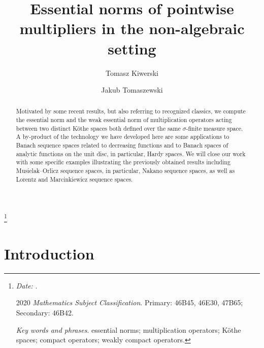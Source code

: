 \documentclass[11pt]{amsart}
\theoremstyle{definition}
\theoremstyle{definition}
\theoremstyle{definition}
\theoremstyle{definition}
\theoremstyle{definition}
\theoremstyle{definition}
\theoremstyle{definition}
\theoremstyle{definition}
\numberwithin{equation}{section}
\numberwithin{equation}{section}
\numberwithin{equation}{section}
\theoremstyle{definition}
\theoremstyle{definition}
\theoremstyle{definition}
\theoremstyle{definition}
\theoremstyle{definition}
\theoremstyle{definition}
\begin{document}
\title{Essential norms of pointwise multipliers in the non-algebraic setting}

\author{Tomasz Kiwerski}
\address[Tomasz Kiwerski]{Pozna\'{n} University of Technology, Institute of Mathematics, Piotrowo 3A, 60-965 Pozna\'{n}, Poland}

\author{Jakub Tomaszewski}
\address[Jakub Tomaszewski]{Pozna\'{n} University of Technology, Institute of Mathematics, Piotrowo 3A, 60-965 Pozna\'{n}, Poland}

\maketitle

\begin{abstract}
	Motivated by some recent results, but also referring to recognized classics, we compute the essential norm and the weak essential norm of
	multiplication operators acting between two distinct K{\" o}the spaces both defined over the same $\sigma$-finite measure space.
	A by-product of the technology we have developed here are some applications to Banach sequence spaces related to decreasing functions
	and to Banach spaces of analytic functions on the unit disc, in particular, Hardy spaces.
	We will close our work with some specific examples illustrating the previously obtained results including Musielak--Orlicz sequence spaces,
	in particular, Nakano sequence spaces, as well as Lorentz and Marcinkiewicz sequence spaces.
\end{abstract}

\tableofcontents

\footnote{{\tiny}
	{\it Date:} \longdate{\today}.
		
	2020 \textit{Mathematics Subject Classification}. Primary: 46B45, 46E30, 47B65; Secondary: 46B42.
	
	\textit{Key words and phrases}. essential norms; multiplication operators; K{\" o}the spaces; compact operators; weakly compact operators.
	}

\section{{\bf Introduction}}
\end{document}
